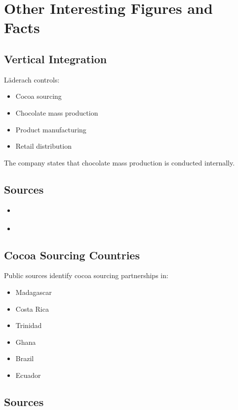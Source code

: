 \section{Other Interesting Figures and Facts}

\subsection{Vertical Integration}

Läderach controls:

\begin{itemize}
    \item Cocoa sourcing
    \item Chocolate mass production
    \item Product manufacturing
    \item Retail distribution
\end{itemize}

The company states that chocolate mass production is conducted internally.

\subsection*{Sources}

\begin{itemize}
    \item \cite{laderachOurBusinessUnits}
    \item \cite{laderachLeadershipNextGeneration}
\end{itemize}

\subsection{Cocoa Sourcing Countries}

Public sources identify cocoa sourcing partnerships in:

\begin{itemize}
    \item Madagascar
    \item Costa Rica
    \item Trinidad
    \item Ghana
    \item Brazil
    \item Ecuador
\end{itemize}

\subsection*{Sources}

